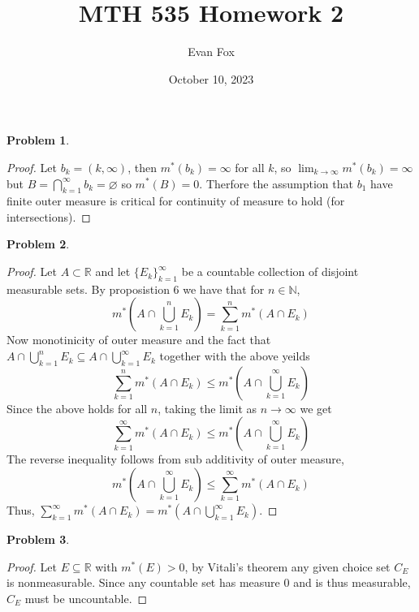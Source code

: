 \documentclass{article}
\title{MTH 535 Homework 2}
\author{Evan Fox}
\date{October 10, 2023}
\newcommand{\R}{\mathbb{R}}
\newcommand{\N}{\mathbb{N}}
\newcommand{\m}{m^*}
\newtheorem{prb}{Problem}
\begin{document}
\maketitle
	    \begin{prb}  \end{prb} 
	    \begin{proof} 
	    	Let $b_k = (k, \infty)$, then $\m(b_k)  = \infty$ for all $k$, so $\lim_{k \to \infty}\m(b_k) = \infty$ but 
		$B = \bigcap_{k = 1}^\infty b_k = \varnothing$ so $\m(B) = 0$. Therfore the assumption 
		that $b_1$ have finite outer measure is critical for continuity of measure to hold (for intersections).

	    \end{proof} 

	    \begin{prb}  \end{prb} 
	    \begin{proof} 
	        Let $A \subset \R$ and let $\{E_k\}_{k = 1}^\infty$ be a countable collection of
		disjoint measurable sets. By proposistion 6
		we have that for $n \in \N$, 
		\[ m^*(A \cap \bigcup_{k = 1}^n E_k) = \sum_{k = 1}^n m^*(A \cap E_k) \] 
		Now monotinicity of outer measure 
		and the fact that $A \cap \bigcup_{k =1}^n E_k \subseteq A \cap \bigcup_{k = 1}^\infty E_k$ together 
		with the above yeilds 
		\begin{equation}
			\sum_{k = 1}^n \m(A \cap E_k) \leq \m(A \cap \bigcup_{k = 1}^\infty E_k )
		\end{equation}
		Since the above holds for all $n$, taking the limit as $n \to \infty$ we get 
		\begin{equation}	
			\sum_{k = 1}^\infty \m(A \cap E_k) \leq \m(A \cap \bigcup_{k = 1}^\infty E_k )
		\end{equation}
		The reverse inequality follows from sub additivity of outer measure, 
		\begin{equation}
			\m(A \cap \bigcup_{k = 1}^\infty E_k ) \leq \sum_{k = 1}^\infty \m(A \cap E_k) 
		\end{equation}
		Thus, $\sum_{k = 1}^\infty \m(A \cap E_k) = \m(A \cap \bigcup_{k=1}^\infty E_k)$.  
	    \end{proof} 

	    \begin{prb}  \end{prb} 
	    \begin{proof}
	    Let $E \subseteq \R$ with $\m(E) > 0$, by Vitali's theorem any given choice set $C_E$ is nonmeasurable. 
	    Since any countable set has measure 0 and is thus measurable, $C_E$ must be uncountable.
	    \end{proof}
\end{document}
